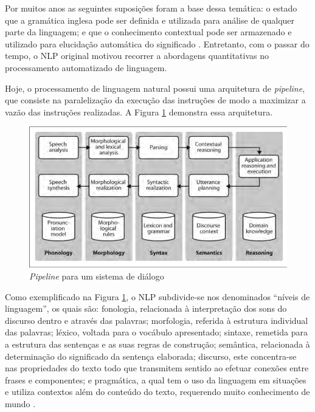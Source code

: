 \documentclass[12pt]{article}
\begin{document}
Por muitos anos as seguintes suposições foram a base dessa temática: o estado que a gramática inglesa pode ser definida e utilizada para análise de qualquer parte da linguagem; e que o conhecimento contextual pode ser armazenado e utilizado para elucidação automática do significado \cite{NLP_book}. Entretanto, com o passar do tempo, o NLP original motivou recorrer a abordagens quantitativas no processamento automatizado de linguagem. 

Hoje, o processamento de linguagem natural possui uma arquitetura de \textit{pipeline}, que consiste na paralelização da execução das instruções de modo a maximizar a vazão das instruções realizadas. A Figura \ref{fig:pipeline_NLP} demonstra essa arquitetura. 

\begin{figure}[ht]
\centering
\includegraphics[scale=0.65]{Imagens/pipeline_architecture_nlp_system.png}
\caption{\textit{Pipeline} para um sistema de diálogo \cite{bird2009natural}}
\label{fig:pipeline_NLP}
\end{figure}

Como exemplificado na Figura \ref{fig:pipeline_NLP}, o NLP subdivide-se nos denominados “níveis de linguagem”, os quais são: fonologia, relacionada à interpretação dos sons do discurso dentro e através das palavras; morfologia, referida à estrutura individual das palavras; léxico, voltada para o vocábulo apresentado; sintaxe, remetida para a estrutura das sentenças e as suas regras de construção; semântica, relacionada à determinação do significado da sentença elaborada; discurso, este concentra-se nas propriedades do texto todo que transmitem sentido ao efetuar conexões entre frases e componentes; e pragmática, a qual tem o uso da linguagem em situações e utiliza contextos além do conteúdo do texto, requerendo muito conhecimento de mundo \cite{NLP_book} \cite{liddy2001natural}. 
\end{document}
